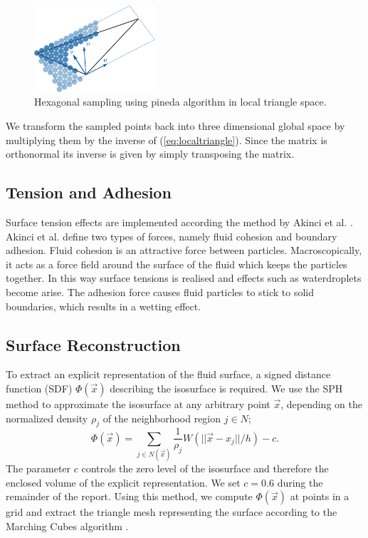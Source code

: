 \documentclass[11pt, letterpaper, twocolumn]{article}
\begin{document}
\begin{figure}[ht]
    \centering
    \includegraphics[width=0.4\textwidth]{images/triangle.pdf}
    \caption{Hexagonal sampling using pineda algorithm in local triangle space.}
    \label{fig:trianglesampling}
\end{figure}
We transform the sampled points back into three dimensional global space by multiplying them by the inverse of (\ref{eq:localtriangle}). Since the matrix is orthonormal its inverse is given by simply transposing the matrix.

\subsection{Tension and Adhesion}
Surface tension effects are implemented according the method by Akinci et al. \cite{akinci2013}.
Akinci et al. define two types of forces, namely fluid cohesion and boundary adhesion. Fluid cohesion is an attractive force between particles. Macroscopically, it acts as a force field around the surface of the fluid which keeps the particles together. In this way surface tensions is realised and effects such as waterdroplets become arise. The adhesion force causes fluid particles to stick to solid boundaries, which results in a wetting effect.

\subsection{Surface Reconstruction}
To extract an explicit representation of the fluid surface, a signed distance function (SDF) \(\Phi(\vec{x}) \) describing the isosurface is required. We use the SPH method to approximate the isosurface at any arbitrary point \(\vec{x}\), depending on the normalized density \(\rho_j\) of the neighborhood region \(j \in N\);
\begin{equation}
  \Phi(\vec{x})= \sum_{j \in N(\vec{x})}\frac{1}{\rho_j} W(||\vec{x} - x_j|| / h) - c.
\end{equation}
The parameter \(c\) controls the zero level of the isosurface and therefore the enclosed volume of the explicit representation. We set \(c = 0.6\) during the remainder of the report. Using this method, we compute \(\Phi(\vec{x})\) at points in a grid and extract the triangle mesh representing the surface according to the Marching Cubes algorithm \cite{lorensen1987}.
\end{document}
